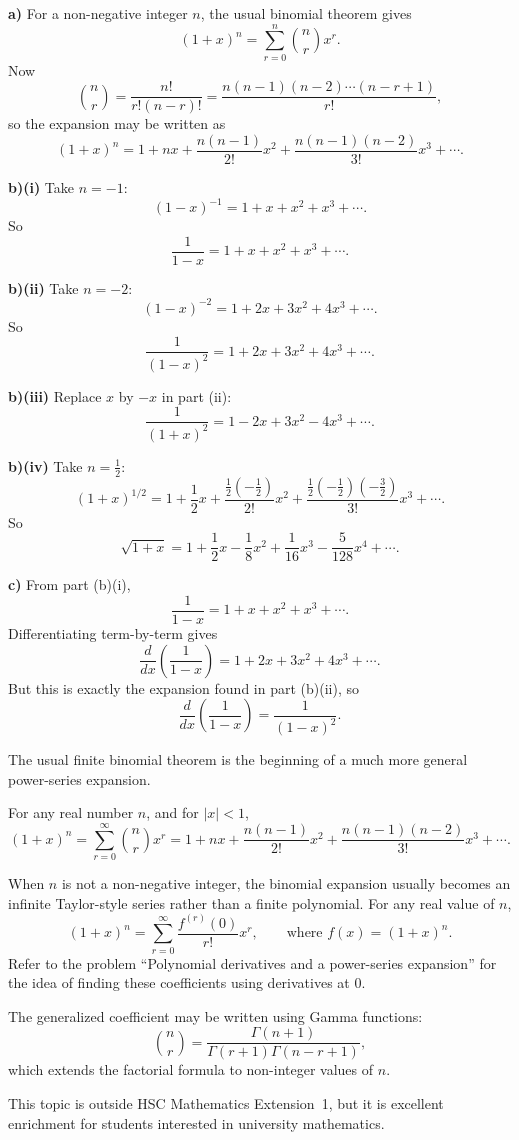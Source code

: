 \begin{solution}
\textbf{a)} For a non-negative integer $n$, the usual binomial theorem gives
\[
(1+x)^n=\sum_{r=0}^{n}\binom{n}{r}x^r.
\]
Now
\[
\binom{n}{r}=\frac{n!}{r!(n-r)!}
=\frac{n(n-1)(n-2)\cdots (n-r+1)}{r!},
\]
so the expansion may be written as
\[
(1+x)^n
=
1+nx+\frac{n(n-1)}{2!}x^2+\frac{n(n-1)(n-2)}{3!}x^3+\cdots.
\]

\textbf{b)(i)} Take $n=-1$:
\[
(1-x)^{-1}=1+x+x^2+x^3+\cdots.
\]
So
\[
\boxed{\frac{1}{1-x}=1+x+x^2+x^3+\cdots.}
\]

\textbf{b)(ii)} Take $n=-2$:
\[
(1-x)^{-2}=1+2x+3x^2+4x^3+\cdots.
\]
So
\[
\boxed{\frac{1}{(1-x)^2}=1+2x+3x^2+4x^3+\cdots.}
\]

\textbf{b)(iii)} Replace $x$ by $-x$ in part (ii):
\[
\boxed{\frac{1}{(1+x)^2}=1-2x+3x^2-4x^3+\cdots.}
\]

\textbf{b)(iv)} Take $n=\tfrac12$:
\[
(1+x)^{1/2}
=1+\frac12x+\frac{\frac12(-\frac12)}{2!}x^2+\frac{\frac12(-\frac12)(-\frac32)}{3!}x^3+\cdots.
\]
So
\[
\boxed{
\sqrt{1+x}
=1+\frac12x-\frac18x^2+\frac1{16}x^3-\frac{5}{128}x^4+\cdots
}.
\]

\textbf{c)} From part (b)(i),
\[
\frac{1}{1-x}=1+x+x^2+x^3+\cdots.
\]
Differentiating term-by-term gives
\[
\frac{d}{dx}\left(\frac{1}{1-x}\right)=1+2x+3x^2+4x^3+\cdots.
\]
But this is exactly the expansion found in part (b)(ii), so
\[
\boxed{
\frac{d}{dx}\left(\frac{1}{1-x}\right)=\frac{1}{(1-x)^2}.
}
\]
\end{solution}

\begin{takeaways}
\item The usual finite binomial theorem is the beginning of a much more general power-series expansion.
\item For any real number $n$, and for $|x|<1$,
\[
(1+x)^n
=
\sum_{r=0}^{\infty}\binom{n}{r}x^r
=
1+nx+\frac{n(n-1)}{2!}x^2+\frac{n(n-1)(n-2)}{3!}x^3+\cdots.
\]
\item When $n$ is not a non-negative integer, the binomial expansion usually becomes an infinite Taylor-style series rather than a finite polynomial. For any real value of $n$,
\[
(1+x)^n = \sum_{r=0}^{\infty} \frac{f^{(r)}(0)}{r!} x^r,
\qquad \text{where } f(x)=(1+x)^n.
\]
Refer to the problem ``Polynomial derivatives and a power-series expansion'' for the idea of finding these coefficients using derivatives at $0$.

\item The generalized coefficient may be written using Gamma functions:
\[
\binom{n}{r}
=
\frac{\Gamma(n+1)}{\Gamma(r+1)\Gamma(n-r+1)},
\]
which extends the factorial formula to non-integer values of $n$.
\item This topic is outside HSC Mathematics Extension~1, but it is excellent enrichment for students interested in university mathematics.
\end{takeaways}

